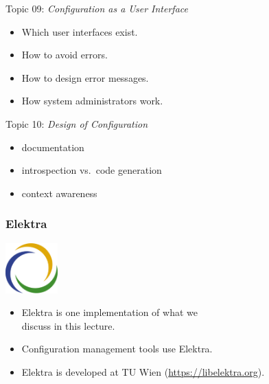 \begin{frame}
	Topic 09: \textit{Configuration as a User Interface}
	\begin{itemize}
		\item Which user interfaces exist.
		\item How to avoid errors.
		\item How to design error messages.
		\item How system administrators work.
	\end{itemize}
\end{frame}

\begin{frame}
	Topic 10: \textit{Design of Configuration}
	\begin{itemize}
		\item documentation
		\item introspection vs.\ code generation
		\item context awareness
	\end{itemize}
\end{frame}


\begin{frame}
	\frametitle{Elektra}
	\hfill \includegraphics[width=2cm]{../figures/logo}
	\vspace{-1cm}
	\begin{itemize}
		\item Elektra is one implementation of what we \\ discuss in this lecture.
		\item Configuration management tools use Elektra.
		\item Elektra is developed at TU Wien (\url{https://libelektra.org}).
	\end{itemize}
\end{frame}

